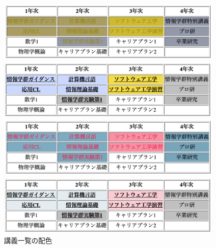 \begin{figure}[H]
\begin{minipage}{.49\columnwidth}
    \end{minipage}
    \begin{minipage}{.49\columnwidth}
        \centering
        \includegraphics[keepaspectratio,width=\textwidth]{../../10_UniversalDesign/no1_table_OC_D.png}
    \end{minipage}
    \begin{minipage}{.49\columnwidth}
        \centering
        \includegraphics[keepaspectratio,width=\textwidth]{../../10_UniversalDesign/no1_table_RC_D.png}
    \end{minipage}
    \begin{minipage}{.49\columnwidth}
        \centering
        \includegraphics[keepaspectratio,width=\textwidth]{../../10_UniversalDesign/no1_table_OC_T.png}
    \end{minipage}
    \begin{minipage}{.49\columnwidth}
        \centering
        \includegraphics[keepaspectratio,width=\textwidth]{../../10_UniversalDesign/no1_table_RC_T.png}
    \end{minipage}
    \caption{講義一覧の配色}
\end{figure}